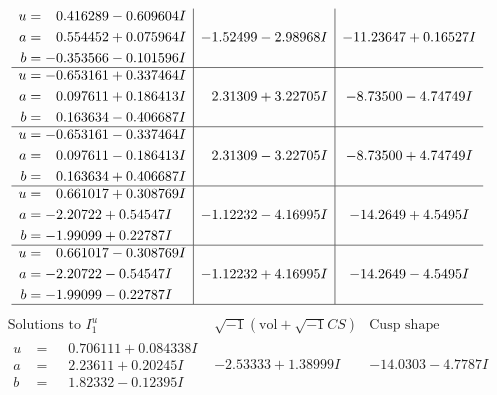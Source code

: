 \documentclass[1p]{elsarticle_modified}
\theoremstyle{definition}
\newcommand{\I}{\sqrt{-1}}
\begin{document}
$$\begin{array}{c|c|c}
\begin{aligned}
u &= \phantom{-}0.416289 - 0.609604 I \\
a &= \phantom{-}0.554452 + 0.075964 I \\
b &= -0.353566 - 0.101596 I\end{aligned}
 & -1.52499 - 2.98968 I & -11.23647 + 0.16527 I \\ \hline\begin{aligned}
u &= -0.653161 + 0.337464 I \\
a &= \phantom{-}0.097611 + 0.186413 I \\
b &= \phantom{-}0.163634 - 0.406687 I\end{aligned}
 & \phantom{-}2.31309 + 3.22705 I & -8.73500 - 4.74749 I \\ \hline\begin{aligned}
u &= -0.653161 - 0.337464 I \\
a &= \phantom{-}0.097611 - 0.186413 I \\
b &= \phantom{-}0.163634 + 0.406687 I\end{aligned}
 & \phantom{-}2.31309 - 3.22705 I & -8.73500 + 4.74749 I \\ \hline\begin{aligned}
u &= \phantom{-}0.661017 + 0.308769 I \\
a &= -2.20722 + 0.54547 I \\
b &= -1.99099 + 0.22787 I\end{aligned}
 & -1.12232 - 4.16995 I & -14.2649 + 4.5495 I \\ \hline\begin{aligned}
u &= \phantom{-}0.661017 - 0.308769 I \\
a &= -2.20722 - 0.54547 I \\
b &= -1.99099 - 0.22787 I\end{aligned}
 & -1.12232 + 4.16995 I & -14.2649 - 4.5495 I\\
 \hline 
 \end{array}$$\newpage$$\begin{array}{c|c|c}  
\text{Solutions to }I^u_{1}& \I (\text{vol} + \sqrt{-1}CS) & \text{Cusp shape}\\
 \hline 
\begin{aligned}
u &= \phantom{-}0.706111 + 0.084338 I \\
a &= \phantom{-}2.23611 + 0.20245 I \\
b &= \phantom{-}1.82332 - 0.12395 I\end{aligned}
 & -2.53333 + 1.38999 I & -14.0303 - 4.7787 I \\ \hline\begin{aligned}

\end{aligned}
\end{array}$$
\end{document}
